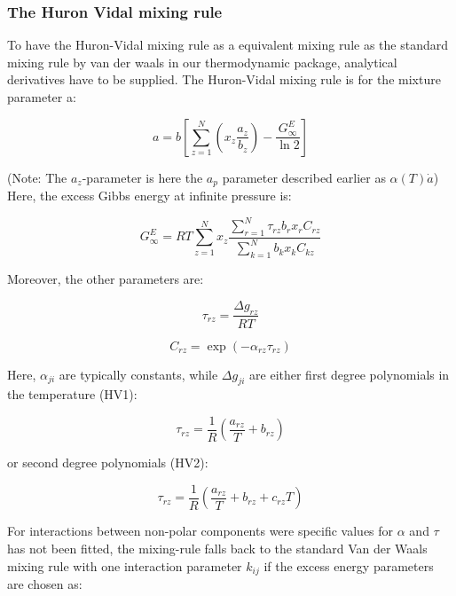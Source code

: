 \documentclass[a4paper, 12pt, english, sintefheadings, sintefcolour]{sintefmemo}
\begin{document}
\subsubsection{The Huron Vidal mixing rule}
To have the Huron-Vidal mixing rule as a equivalent mixing rule as the
standard mixing rule by van der waals in our thermodynamic package, analytical
derivatives have to be supplied. The Huron-Vidal mixing rule is for the
mixture parameter a:

\begin{equation}
a=b\left[\sum_{z=1}^N\left(x_z\frac{a_z}{b_z}\right)-\frac{G_{\infty}^E}{\ln{2}}\right]
\end{equation}

(Note: The $a_z$-parameter is here the $a_p$ parameter described earlier as  $\alpha(T)\dot a$)
Here, the excess Gibbs energy at infinite pressure is:

\begin{equation}
G_{\infty}^E=RT\sum_{z=1}^Nx_z\frac{\sum_{r=1}^N\tau_{rz}b_rx_rC_{rz}}{\sum_{k=1}^N b_kx_kC_{kz}}
\end{equation}

Moreover, the other parameters are:

\begin{equation}
\tau_{rz}=\frac{\Delta g_{rz}}{RT}
\end{equation}

\begin{equation}
C_{rz}=\exp{(-\alpha_{rz}\tau_{rz})}
\end{equation}

Here, $\alpha_{ji}$ are typically constants, while $\Delta g_{ji}$ are either first degree polynomials in the temperature (HV1):

\begin{equation}
\tau_{rz}=\frac{1}{R}\left(\frac{a_{rz}}{T}+b_{rz}\right)
\end{equation}

or second degree polynomials (HV2):

\begin{equation}
\tau_{rz}=\frac{1}{R}\left(\frac{a_{rz}}{T}+b_{rz}+c_{rz}T\right)
\end{equation}

For interactions between non-polar components were specific values for
$\alpha$ and $\tau$ has not been fitted, the mixing-rule falls back to the standard Van der Waals
mixing rule with one interaction parameter $k_{ij}$ if the excess energy
parameters are chosen as:
\end{document}
